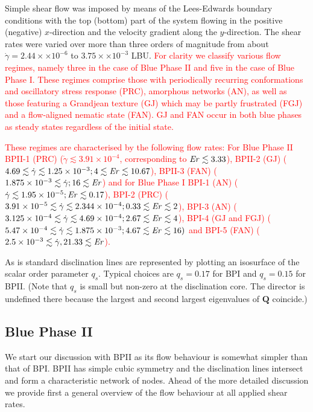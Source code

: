 \documentclass[8.5pt,twoside,twocolumn]{article}
\newcommand{\e}[1]{\times10^{#1}}
\newcommand{\gd}{\dot{\gamma}}
\newcommand{\rev}[1]{{\textcolor{red}{#1}}}
\begin{document}
Simple shear flow was imposed by means of the Lees-Edwards boundary
conditions with
the top (bottom) part of the system flowing in the positive (negative) $x$-direction and the 
velocity gradient along the $y$-direction.
The shear rates were varied over more than three orders of magnitude from about 
$\gd=2.44\times \e{-6}$ to $3.75\times\e{-3}$ LBU.
\rev{
For clarity we classify various flow regimes, namely three in the case of Blue Phase II and five in the 
case of Blue Phase I. These regimes comprise those with periodically recurring conformations and oscillatory stress response (PRC), 
amorphous networks (AN), as well as those featuring a Grandjean texture (GJ) which 
may be partly frustrated (FGJ) and a flow-aligned nematic state (FAN). 
GJ and FAN occur in both blue phases as steady states regardless of the initial state.
}

\rev{
These regimes are characterised by the following flow rates: 
For Blue Phase II BPII-1 (PRC) ($\gd \lesssim 3.91\e{-4}$, corresponding to ${\it Er} \lesssim 3.33$), 
BPII-2 (GJ) ($4.69\lesssim \gd\lesssim 1.25\e{-3}; 4\lesssim {\it Er} \lesssim 10.67$), 
BPII-3 (FAN) ($1.875\e{-3}\lesssim \gd; 16 \lesssim {\it Er}$) 
and for Blue Phase I BPI-1 (AN) ($\gd \lesssim 1.95\e{-5}; {\it Er} \lesssim 0.17$),  
BPI-2 (PRC) ($3.91\e{-5}\lesssim \gd \lesssim 2.344\e{-4}; 0.33\lesssim {\it Er} \lesssim 2$),
BPI-3 (AN) ($3.125\e{-4}\lesssim \gd\lesssim 4.69\e{-4}; 2.67 \lesssim {\it Er} \lesssim 4$),
BPI-4 (GJ and FGJ) ($5.47\e{-4} \lesssim \gd \lesssim 1.875\e{-3}; 4.67\lesssim {\it Er} \lesssim 16)$ and
BPI-5 (FAN) ($2.5\e{-3}\lesssim \gd, 21.33\lesssim {\it Er}$).
}

As is standard \cite{Henrich:2010b,Henrich:2012b} disclination lines are represented by plotting an isosurface of the scalar order parameter $q_s$. 
Typical choices are $q_s=0.17$ for BPI and $q_s=0.15$ for BPII.
(Note that $q_s$ is small but non-zero at the disclination core. 
The director is undefined there because the largest and second largest eigenvalues of ${\mathbf Q}$ coincide.)

\subsection{Blue Phase II}

We start our discussion with BPII as its flow behaviour is somewhat simpler 
than that of BPI. BPII has simple cubic symmetry and the disclination lines 
intersect and form a characteristic network of nodes.
Ahead of the more detailed discussion we provide first a general overview of the 
flow behaviour at all applied shear rates.
\end{document}
